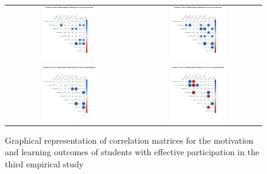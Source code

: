 \begin{figure}[htb]
 \caption{Graphical representation of correlation matrices for the motivation and learning outcomes of students with effective participation in the third empirical study}
 \label{fig:effective-correlation-matrices-third-study}
 \centering
 \begin{tabular}{cc}
 \includegraphics[width=0.45\textwidth]{images/chap-evaluation/corr-effective-third/wo-gamified1.png}&
 \includegraphics[width=0.45\textwidth]{images/chap-evaluation/corr-effective-third/ont-gamified1.png}\\
 \includegraphics[width=0.45\textwidth]{images/chap-evaluation/corr-effective-third/wo-gamifiedMaster1.png}&
 \includegraphics[width=0.45\textwidth]{images/chap-evaluation/corr-effective-third/ont-gamifiedMaster1.png}\\

\end{tabular}
\end{figure}
